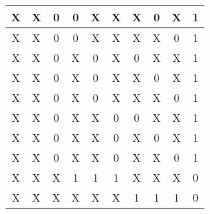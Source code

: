 \begin{center}
\begin{table}[h]
\begin{center}
\begin{tabular}{|c|c|c|c|c|c|c|c|c||c|}
            X  & X  & 0  & 0  & X  & X  & X  & 0  & X  & 1 \\ \hline
            X  & X  & 0  & 0  & X  & X  & X  & X  & 0  & 1 \\ \hline
            X  & X  & 0  & X  & 0  & X  & 0  & X  & X  & 1 \\ \hline
            X  & X  & 0  & X  & 0  & X  & X  & 0  & X  & 1 \\ \hline
            X  & X  & 0  & X  & 0  & X  & X  & X  & 0  & 1 \\ \hline
            X  & X  & 0  & X  & X  & 0  & 0  & X  & X  & 1 \\ \hline
            X  & X  & 0  & X  & X  & 0  & X  & 0  & X  & 1 \\ \hline
            X  & X  & 0  & X  & X  & 0  & X  & X  & 0  & 1 \\ \hline
            X  & X  & X  & 1  & 1  & 1  & X  & X  & X  & 0 \\ \hline
            X  & X  & X  & X  & X  & X  & 1  & 1  & 1  & 0 \\ \hline
            \end{tabular}
        \end{center}
    \end{table}
\end{center}

